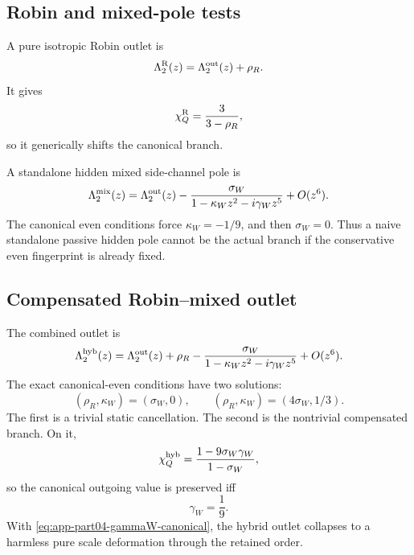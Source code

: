 \subsection{Robin and mixed-pole tests}
\label{subsec:app-part04-robin-mixed-tests}

A pure isotropic Robin outlet is
\begin{equation}
\label{eq:app-part04-robin-outlet}
\Lambda_2^{\rm R}(z)=\Lambda_2^{\rm out}(z)+\rho_R.
\end{equation}
It gives
\begin{equation}
\label{eq:app-part04-chi-robin}
\chi_Q^{\rm R}=\frac{3}{3-\rho_R},
\end{equation}
so it generically shifts the canonical branch.

A standalone hidden mixed side-channel pole is
\begin{equation}
\label{eq:app-part04-mixed-pole-outlet}
\Lambda_2^{\rm mix}(z)
=
\Lambda_2^{\rm out}(z)
-
\frac{\sigma_W}{1-\kappa_Wz^2-i\gamma_Wz^5}+O(z^6).
\end{equation}
The canonical even conditions force \(\kappa_W=-1/9\), and then \(\sigma_W=0\).  Thus a naive standalone passive hidden pole cannot be the actual branch if the conservative even fingerprint is already fixed.

\subsection{Compensated Robin--mixed outlet}
\label{subsec:app-part04-compensated-robin-mixed}

The combined outlet is
\begin{equation}
\label{eq:app-part04-hybrid-outlet}
\Lambda_2^{\rm hyb}(z)
=
\Lambda_2^{\rm out}(z)+\rho_R
-
\frac{\sigma_W}{1-\kappa_Wz^2-i\gamma_Wz^5}+O(z^6).
\end{equation}
The exact canonical-even conditions have two solutions:
\begin{equation}
\label{eq:app-part04-hybrid-even-solutions}
(\rho_R,\kappa_W)=(\sigma_W,0),
\qquad
(\rho_R,\kappa_W)=(4\sigma_W,1/3).
\end{equation}
The first is a trivial static cancellation.  The second is the nontrivial compensated branch.  On it,
\begin{equation}
\label{eq:app-part04-hybrid-chiQ}
\chi_Q^{\rm hyb}
=
\frac{1-9\sigma_W\gamma_W}{1-\sigma_W},
\end{equation}
so the canonical outgoing value is preserved iff
\begin{equation}
\label{eq:app-part04-gammaW-canonical}
\gamma_W=\frac19.
\end{equation}
With \eqref{eq:app-part04-gammaW-canonical}, the hybrid outlet collapses to a harmless pure scale deformation through the retained order.

